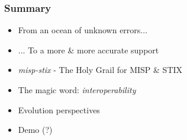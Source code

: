 \begin{frame}
    \frametitle{Summary}
    \begin{itemize}
        \item From an ocean of unknown errors...
        \item ... To a more \& more accurate support
        \item \emph{misp-stix} - The Holy Grail for MISP \& STIX
        \item The magic word: \emph{interoperability}
        \item Evolution perspectives
        \item Demo (?)
    \end{itemize}
\end{frame}
